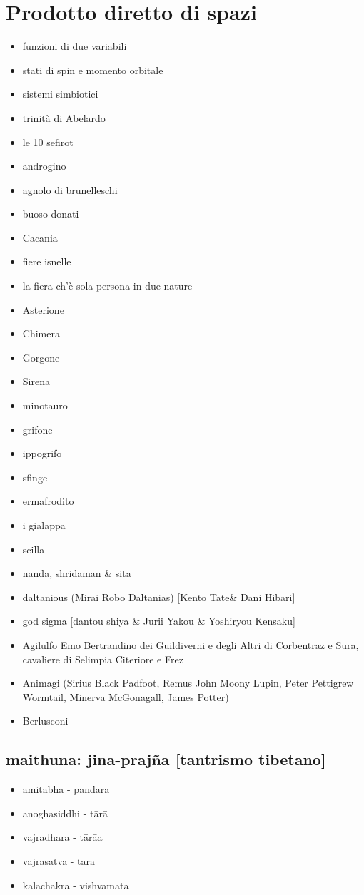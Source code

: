\documentclass[danish,a4paper,12pt]{article}
\begin{document}
\section*{Prodotto diretto di spazi}
\begin{itemize}
  \item[] funzioni di due variabili
  \item[] stati di spin e momento orbitale
  \item[] sistemi simbiotici
  \item[] trinità di Abelardo
  \item[] le 10 sefirot
  \item[] androgino
  \item[] agnolo di brunelleschi
  \item[] buoso donati
  \item[] Cacania
  \item[] fiere isnelle
  \item[] la fiera ch'è sola persona in due nature
  \item[] Asterione
  \item[] Chimera
  \item[] Gorgone
  \item[] Sirena
  \item[] minotauro
  \item[] grifone
  \item[] ippogrifo
  \item[] sfinge
  \item[] ermafrodito
  \item[] i gialappa
  \item[] scilla
  \item[] nanda, shridaman \& sita
  \item[] daltanious (Mirai Robo Daltanias) [Kento Tate\& Dani Hibari]
  \item[] god sigma [dantou shiya \& Jurii Yakou \& Yoshiryou
  Kensaku]
  \item[] Agilulfo Emo Bertrandino dei Guildiverni e degli Altri di
  Corbentraz e Sura, cavaliere di Selimpia Citeriore e Frez
  \item[] Animagi (Sirius Black Padfoot, Remus John Moony Lupin,
  Peter Pettigrew Wormtail, Minerva McGonagall, James Potter)
  \item[] Berlusconi
\end{itemize}
\subsection*{maithuna: jina-prajña [tantrismo tibetano]}
\begin{itemize}
  \item[] amitābha - pāndāra
  \item[] anoghasiddhi - tārā
  \item[] vajradhara - tārāa
  \item[] vajrasatva - tārā
  \item[] kalachakra - vishvamata
\end{itemize}
\end{document}
